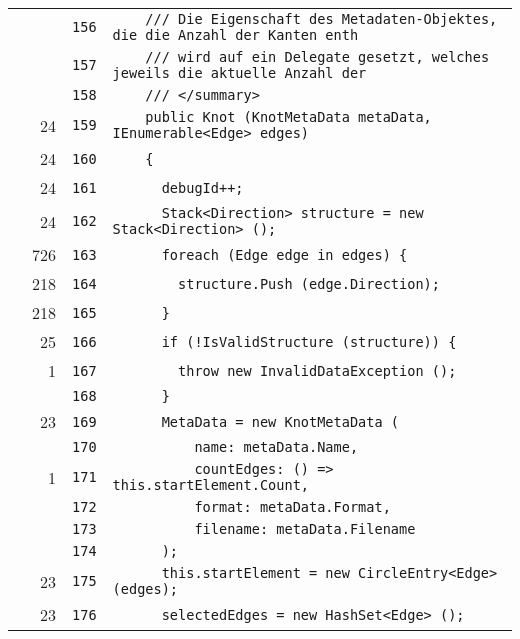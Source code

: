 \documentclass[a4paper,10pt]{article}
\begin{document}
\begin{longtable}[l]{lrrl}
\cellcolor{gray} &  & \verb~156~ & \verb~    /// Die Eigenschaft des Metadaten-Objektes, die die Anzahl der Kanten enth~\\
\cellcolor{gray} &  & \verb~157~ & \verb~    /// wird auf ein Delegate gesetzt, welches jeweils die aktuelle Anzahl der~\\
\cellcolor{gray} &  & \verb~158~ & \verb~    /// </summary>~\\
\cellcolor{green} & 24 & \verb~159~ & \verb~    public Knot (KnotMetaData metaData, IEnumerable<Edge> edges)~\\
\cellcolor{green} & 24 & \verb~160~ & \verb~    {~\\
\cellcolor{green} & 24 & \verb~161~ & \verb~      debugId++;~\\
\cellcolor{green} & 24 & \verb~162~ & \verb~      Stack<Direction> structure = new Stack<Direction> ();~\\
\cellcolor{green} & 726 & \verb~163~ & \verb~      foreach (Edge edge in edges) {~\\
\cellcolor{green} & 218 & \verb~164~ & \verb~        structure.Push (edge.Direction);~\\
\cellcolor{green} & 218 & \verb~165~ & \verb~      }~\\
\cellcolor{green} & 25 & \verb~166~ & \verb~      if (!IsValidStructure (structure)) {~\\
\cellcolor{green} & 1 & \verb~167~ & \verb~        throw new InvalidDataException ();~\\
\cellcolor{gray} &  & \verb~168~ & \verb~      }~\\
\cellcolor{green} & 23 & \verb~169~ & \verb~      MetaData = new KnotMetaData (~\\
\cellcolor{gray} &  & \verb~170~ & \verb~          name: metaData.Name,~\\
\cellcolor{green} & 1 & \verb~171~ & \verb~          countEdges: () => this.startElement.Count,~\\
\cellcolor{gray} &  & \verb~172~ & \verb~          format: metaData.Format,~\\
\cellcolor{gray} &  & \verb~173~ & \verb~          filename: metaData.Filename~\\
\cellcolor{gray} &  & \verb~174~ & \verb~      );~\\
\cellcolor{green} & 23 & \verb~175~ & \verb~      this.startElement = new CircleEntry<Edge> (edges);~\\
\cellcolor{green} & 23 & \verb~176~ & \verb~      selectedEdges = new HashSet<Edge> ();~\\

\end{longtable}
\end{document}

